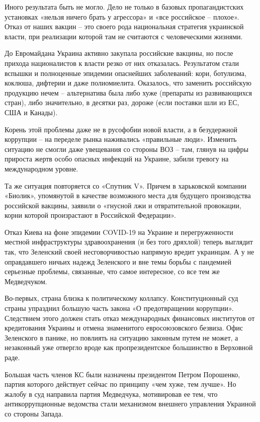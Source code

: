 Иного результата быть не могло. Дело не только в базовых пропагандистских
установках «нельзя ничего брать у агрессора» и «все российское – плохое». Отказ
от наших вакцин – это своего рода национальная стратегия украинской власти, при
реализации которой там не считаются с человеческими жизнями.

До Евромайдана Украина активно закупала российские вакцины, но после прихода
националистов к власти резко от них отказалась. Результатом стали вспышки и
полноценные эпидемии опаснейших заболеваний: кори, ботулизма, коклюша, дифтерии
и даже полиомиелита. Оказалось, что заменить российскую продукцию нечем –
альтернатива была либо хуже (препараты из развивающихся стран), либо
значительно, в десятки раз, дороже (если поставки шли из ЕС, США и Канады). 

Корень этой проблемы даже не в русофобии новой власти, а в безудержной
коррупции – на переделе рынка наживались «правильные люди». Изменить ситуацию
не смогли даже увещевания со стороны ВОЗ – там, глянув на цифры прироста жертв
особо опасных инфекций на Украине, забили тревогу на международном уровне.

Та же ситуация повторяется со «Спутник V». Причем в харьковской компании
«Биолик», упомянутой в качестве возможного места для будущего производства
российской вакцины, заявили о «гнусной лжи и отвратительной провокации, корни
которой произрастают в Российской Федерации».

Отказ Киева на фоне эпидемии COVID-19 на Украине и перегруженности местной
инфраструктуры здравоохранения (и без того дряхлой) теперь выглядит так, что
Зеленский своей несговорчивостью напрямую вредит украинцам. А у не оправдавшего
ничьих надежд Зеленского и вне темы борьбы с пандемией серьезные проблемы,
связанные, что самое интересное, со все тем же Медведчуком. 

Во-первых, страна близка к политическому коллапсу. Конституционный суд страны
упразднил большую часть закона «О предотвращении коррупции». Следствием этого
должен стать отказ международных финансовых институтов от кредитования Украины
и отмена знаменитого евросоюзовского безвиза. Офис Зеленского в панике, но
повлиять на ситуацию законным путем не может, а незаконный уже отвергло вроде
как пропрезидентское большинство в Верховной раде.

Большая часть членов КС были назначены президентом Петром Порошенко, партия
которого действует сейчас по принципу «чем хуже, тем лучше». Но жалобу в суд
направила партия Медведчука, мотивировав ее тем, что антикоррупционные
ведомства стали механизмом внешнего управления Украиной со стороны Запада.

